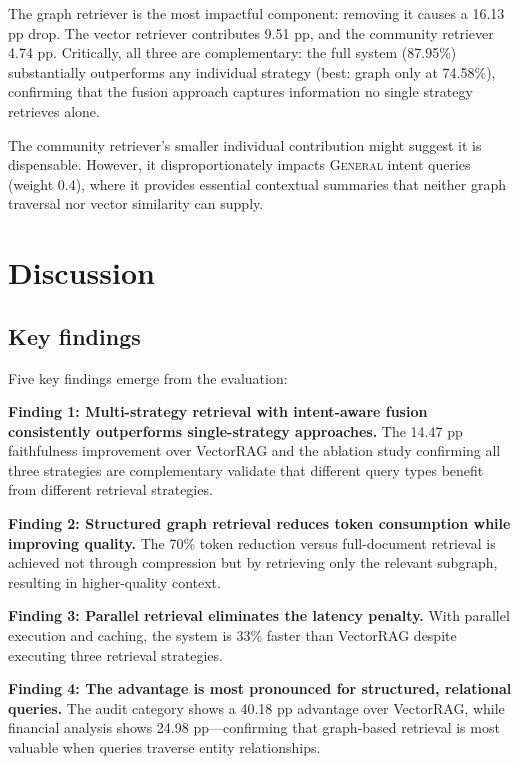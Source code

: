 \documentclass[review]{elsarticle}
\begin{document}
The graph retriever is the most impactful component: removing it causes a 16.13 pp drop. The vector retriever contributes 9.51 pp, and the community retriever 4.74 pp. Critically, all three are complementary: the full system (87.95\%) substantially outperforms any individual strategy (best: graph only at 74.58\%), confirming that the fusion approach captures information no single strategy retrieves alone.

The community retriever's smaller individual contribution might suggest it is dispensable. However, it disproportionately impacts \textsc{General} intent queries (weight 0.4), where it provides essential contextual summaries that neither graph traversal nor vector similarity can supply.


\section{Discussion}
\label{sec:discussion}

\subsection{Key findings}

Five key findings emerge from the evaluation:

\textbf{Finding 1: Multi-strategy retrieval with intent-aware fusion consistently outperforms single-strategy approaches.} The 14.47 pp faithfulness improvement over VectorRAG and the ablation study confirming all three strategies are complementary validate that different query types benefit from different retrieval strategies.

\textbf{Finding 2: Structured graph retrieval reduces token consumption while improving quality.} The 70\% token reduction versus full-document retrieval is achieved not through compression but by retrieving only the relevant subgraph, resulting in higher-quality context.

\textbf{Finding 3: Parallel retrieval eliminates the latency penalty.} With parallel execution and caching, the system is 33\% faster than VectorRAG despite executing three retrieval strategies.

\textbf{Finding 4: The advantage is most pronounced for structured, relational queries.} The audit category shows a 40.18 pp advantage over VectorRAG, while financial analysis shows 24.98 pp---confirming that graph-based retrieval is most valuable when queries traverse entity relationships.
\end{document}
